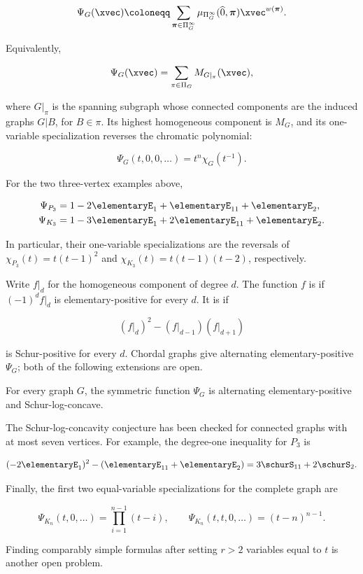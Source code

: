 \[
  \Psi_G(\xvec)
  \coloneqq
  \sum_{\boldsymbol{\pi}\in\Pi_G^\infty}
  \mu_{\Pi_G^\infty}(\widehat{0},\boldsymbol{\pi})
  \xvec^{w(\boldsymbol{\pi})}.
\]

Equivalently,

\[
  \Psi_G(\xvec)=\sum_{\pi\in\Pi_G}M_{G|_\pi}(\xvec),
\]

where \(G|_\pi\) is the spanning subgraph whose connected components are the
induced graphs \(G|B\), for \(B\in\pi\).  Its highest homogeneous component is
\(M_G\), and its one-variable specialization reverses the chromatic
polynomial:

\[
  \Psi_G(t,0,0,\dotsc)=t^n\chi_G(t^{-1}).
\]

For the two three-vertex examples above,

\begin{align*}
  \Psi_{P_3}
    &=1-2\elementaryE_1+\elementaryE_{11}+\elementaryE_2,\\
  \Psi_{K_3}
    &=1-3\elementaryE_1+2\elementaryE_{11}+\elementaryE_2.
\end{align*}

In particular, their one-variable specializations are the reversals of
\(\chi_{P_3}(t)=t(t-1)^2\) and
\(\chi_{K_3}(t)=t(t-1)(t-2)\), respectively.

Write \(f|_d\) for the homogeneous component of degree \(d\).  The function
\(f\) is  if
\((-1)^d f|_d\) is elementary-positive for every \(d\).  It is
 if

\[
  (f|_d)^2-(f|_{d-1})(f|_{d+1})
\]

is Schur-positive for every \(d\).  Chordal graphs give alternating
elementary-positive \(\Psi_G\); both of the following extensions are open.

\begin{conjecture}
For every graph \(G\), the symmetric function \(\Psi_G\) is alternating
elementary-positive and Schur-log-concave.
\end{conjecture}

The Schur-log-concavity conjecture has been checked for connected graphs with
at most seven vertices.  For example, the degree-one inequality for \(P_3\)
is

\[
  (-2\elementaryE_1)^2
  -(\elementaryE_{11}+\elementaryE_2)
  =3\schurS_{11}+2\schurS_2.
\]

Finally, the first two equal-variable specializations for the complete graph
are

\[
  \Psi_{K_n}(t,0,\dotsc)=\prod_{i=1}^{n-1}(t-i),
  \qquad
  \Psi_{K_n}(t,t,0,\dotsc)=(t-n)^{n-1}.
\]

Finding comparably simple formulas after setting \(r>2\) variables equal to
\(t\) is another open problem.

